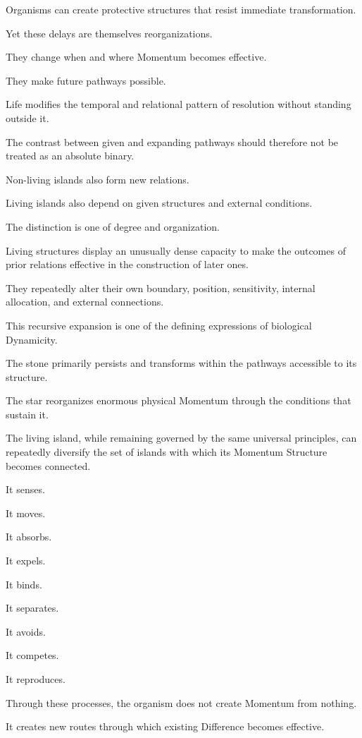 Organisms can create protective structures that resist immediate transformation.

Yet these delays are themselves reorganizations.

They change when and where Momentum becomes effective.

They make future pathways possible.

Life modifies the temporal and relational pattern of resolution without standing outside it.

The contrast between given and expanding pathways should therefore not be treated as an absolute binary.

Non-living islands also form new relations.

Living islands also depend on given structures and external conditions.

The distinction is one of degree and organization.

Living structures display an unusually dense capacity to make the outcomes of prior relations effective in the construction of later ones.

They repeatedly alter their own boundary, position, sensitivity, internal allocation, and external connections.

This recursive expansion is one of the defining expressions of biological Dynamicity.

The stone primarily persists and transforms within the pathways accessible to its structure.

The star reorganizes enormous physical Momentum through the conditions that sustain it.

The living island, while remaining governed by the same universal principles, can repeatedly diversify the set of islands with which its Momentum Structure becomes connected.

It senses.

It moves.

It absorbs.

It expels.

It binds.

It separates.

It avoids.

It competes.

It reproduces.

Through these processes, the organism does not create Momentum from nothing.

It creates new routes through which existing Difference becomes effective.

